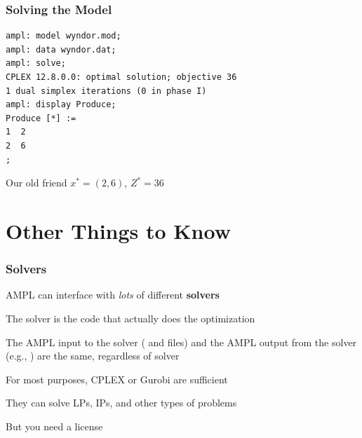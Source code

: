 \begin{frame}[fragile]

	\frametitle{Solving the Model}
	
\begin{lstlisting}
ampl: model wyndor.mod;
ampl: data wyndor.dat;
ampl: solve;
CPLEX 12.8.0.0: optimal solution; objective 36
1 dual simplex iterations (0 in phase I)
ampl: display Produce;
Produce [*] :=
1  2
2  6
;
\end{lstlisting}

	\bit
	\item Our old friend $x^* = (2,6)$, $Z^* = 36$
	\eit

\end{frame}




\section{Other Things to Know}

\begin{frame}[fragile]

	\frametitle{Solvers}
	
	\bit
	\item AMPL can interface with {\em lots} of different {\bf solvers}
	\item The solver is the code that actually does the optimization
	\item The AMPL input to the solver ( and  files) and the AMPL output from the solver (e.g., ) are the same, regardless of solver
	\item For most purposes, CPLEX or Gurobi are sufficient
		\bit
		\item They can solve LPs, IPs, and other types of problems
		\item But you need a license
		\eit
	\eit
	
\end{frame}


